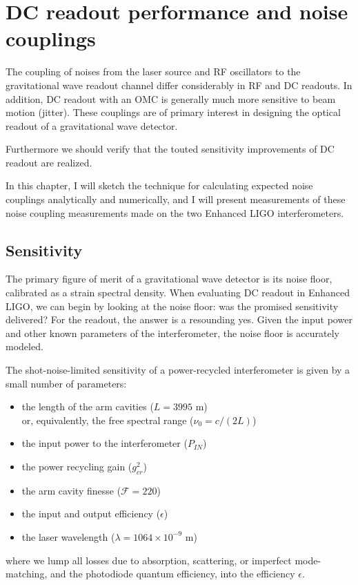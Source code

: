 \chapter{DC readout performance and noise couplings}
\label{chapter5}

The coupling of noises from the laser source and RF oscillators to the
gravitational wave readout channel differ considerably in RF and DC
readouts.  In addition, DC readout with an OMC is generally much more
sensitive to beam motion (jitter).  These couplings are of primary
interest in designing the optical readout of a gravitational wave
detector.

Furthermore we should verify that the touted sensitivity improvements
of DC readout are realized.

In this chapter, I will sketch the technique for calculating expected
noise couplings analytically and numerically, and I will present
measurements of these noise coupling measurements made on the two
Enhanced LIGO interferometers.

\section{Sensitivity}

The primary figure of merit of a gravitational wave detector is its
noise floor, calibrated as a strain spectral density.  When evaluating
DC readout in Enhanced LIGO, we can begin by looking at the noise
floor: was the promised sensitivity delivered?  For the readout, the
answer is a resounding yes.  Given the input power and other known
parameters of the interferometer, the noise floor is accurately
modeled.

The shot-noise-limited sensitivity of a power-recycled interferometer
is given by a small number of parameters:

\begin{itemize}
\item the length of the arm cavities ($L = 3995$ m)\\
or, equivalently, the free spectral range ($\nu_0 = c/(2L)$)
\item the input power to the interferometer ($P_{IN}$)
\item the power recycling gain ($g_{cr}^2$)
\item the arm cavity finesse ($\mathcal{F} = 220$)
\item the input and output efficiency ($\epsilon$)
\item the laser wavelength ($\lambda = 1064\times10^{-9}$ m)
\end{itemize}
where we lump all losses due to absorption, scattering, or imperfect
mode-matching, and the photodiode quantum efficiency, into the efficiency
$\epsilon$.

